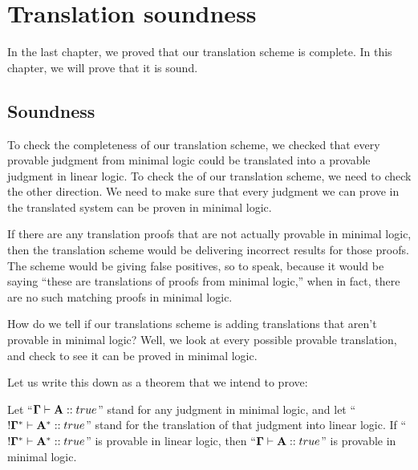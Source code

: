 \documentclass[../../../main.tex]{subfiles}
\begin{document}
\chapter{Translation soundness}

In the last chapter, we proved that our translation scheme is complete. In this chapter, we will prove that it is sound.


\section{Soundness}

To check the completeness of our translation scheme, we checked that every provable judgment from minimal logic could be translated into a provable judgment in linear logic. To check the  of our translation scheme, we need to check the other direction. We need to make sure that every judgment we can prove in the translated system can be proven in minimal logic.

If there are any translation proofs that are not actually provable in minimal logic, then the translation scheme would be delivering incorrect results for those proofs. The scheme would be giving false positives, so to speak, because it would be saying ``these are translations of proofs from minimal logic,'' when in fact, there are no such matching proofs in minimal logic.

How do we tell if our translations scheme is adding translations that aren't provable in minimal logic? Well, we look at every possible provable translation, and check to see it can be proved in minimal logic.

Let us write this down as a theorem that we intend to prove:

\begin{theorem}[Soundness]
Let ``$\nd{\Gamma} \ndturnstile/ \nd{A} :: true$'' stand for any judgment in minimal logic, and let ``$\bang/\nd{\Gamma}^{*} \ndturnstile/ \nd{A}^{*} :: true$'' stand for the translation of that judgment into linear logic. If ``$\bang/\nd{\Gamma}^{*} \ndturnstile/ \nd{A}^{*} :: true$'' is provable in linear logic, then ``$\nd{\Gamma} \ndturnstile/ \nd{A} :: true$'' is provable in minimal logic.
\end{theorem}


\end{document}
